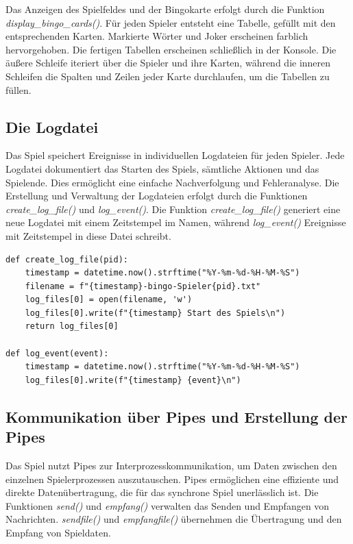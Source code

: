 \documentclass{llncs}
\begin{document}
Das Anzeigen des Spielfeldes und der Bingokarte erfolgt durch die Funktion \textit{display\_bingo\_cards()}. Für jeden Spieler entsteht eine Tabelle, gefüllt mit den entsprechenden Karten. Markierte Wörter und Joker erscheinen farblich hervorgehoben. Die fertigen Tabellen erscheinen schließlich in der Konsole. Die äußere Schleife iteriert über die Spieler und ihre Karten, während die inneren Schleifen die Spalten und Zeilen jeder Karte durchlaufen, um die Tabellen zu füllen.

\subsection{Die Logdatei}

Das Spiel speichert Ereignisse in individuellen Logdateien für jeden Spieler. Jede Logdatei dokumentiert das Starten des Spiels, sämtliche Aktionen und das Spielende. Dies ermöglicht eine einfache Nachverfolgung und Fehleranalyse. Die Erstellung und Verwaltung der Logdateien erfolgt durch die Funktionen \textit{create\_log\_file()} und \textit{log\_event()}. Die Funktion \textit{create\_log\_file()} generiert eine neue Logdatei mit einem Zeitstempel im Namen, während \textit{log\_event()} Ereignisse mit Zeitstempel in diese Datei schreibt.

\begin{lstlisting}[caption=Erstellung und Verwaltung der Logdatei]
def create_log_file(pid):
    timestamp = datetime.now().strftime("%Y-%m-%d-%H-%M-%S")
    filename = f"{timestamp}-bingo-Spieler{pid}.txt"
    log_files[0] = open(filename, 'w')
    log_files[0].write(f"{timestamp} Start des Spiels\n")
    return log_files[0]

def log_event(event):
    timestamp = datetime.now().strftime("%Y-%m-%d-%H-%M-%S")
    log_files[0].write(f"{timestamp} {event}\n")
\end{lstlisting}

\subsection{Kommunikation über Pipes und Erstellung der Pipes}

Das Spiel nutzt Pipes zur Interprozesskommunikation, um Daten zwischen den einzelnen Spielerprozessen auszutauschen. Pipes ermöglichen eine effiziente und direkte Datenübertragung, die für das synchrone Spiel unerlässlich ist. Die Funktionen \textit{send()} und \textit{empfang()} verwalten das Senden und Empfangen von Nachrichten. \textit{sendfile()} und \textit{empfangfile()} übernehmen die Übertragung und den Empfang von Spieldaten.
\end{document}
